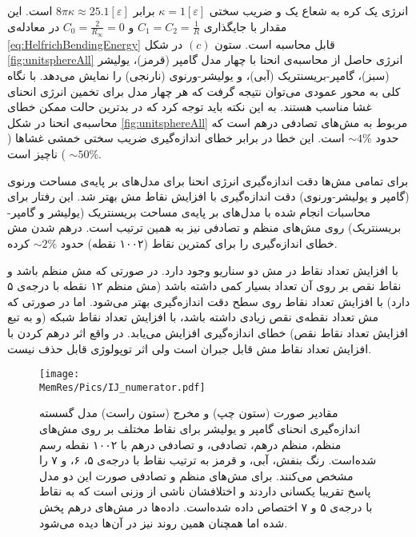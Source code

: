 
انرژی یک کره‌ به شعاع یک و ضریب سختی 
$\kappa=1[\varepsilon]$
برابر 
$8\pi\kappa\approx 25.1[\varepsilon]$
است. این مقدار با جایگذاری 
$C_1=C_2=\frac{1}{R}$
و
$C_0=\frac{2}{R_\infty}=0$
در معادله‌ی 
\ref{eq:HelfrichBendingEnergy}
قابل محاسبه‌ است. ستون 
$(c)$
 در شکل 
\ref{fig:unitsphereAll}
انرژی حاصل از محاسبه‌ی انحنا با چهار مدل گامپر (قرمز)، یولیشر (سبز)، گامپر-بریسنتریک (آبی)، و یولیشر-ورنوی (نارنجی) را نمایش می‌دهد. با نگاه کلی به محور عمودی می‌توان نتیجه گرفت که هر چهار مدل برای تخمین انرژی انحنای غشا مناسب هستند. به این نکته باید توجه کرد که در بدترین حالت ممکن خطای محاسبه‌ی انحنا در شکل 
\ref{fig:unitsphereAll}
مربوط به مش‌های تصادفی درهم است که حدود
$\sim4\%$
است. این خطا در برابر خطای اندازه‌گیری ضریب سختی خمشی غشا‌ها (
$\sim50\%$
) ناچیز است.

برای تمامی مش‌ها دقت اندازه‌گیری انرژی انحنا برای مدل‌های بر پایه‌ی مساحت ورنوی (گامپر و یولیشر-ورنوی) دقت اندازه‌گیری با افزایش نقاط مش بهتر شد. این رفتار برای محاسبات انجام شده با مدل‌های بر پایه‌ی مساحت بریسنتریک (یولیشر و گامپر-بریسنتریک) روی مش‌های منظم و تصادفی نیز به همین ترتیب است. درهم شدن مش خطای اندازه‌‌گیری را برای کمترین نقاط (۱۰۰۲ نقطه) حدود 
$\sim2\%$
کرده. 

با افزایش تعداد نقاط در مش دو سناریو وجود دارد. در صورتی که مش‌ منظم باشد و نقاط نقص بر روی آن تعداد بسیار کمی داشته باشد (مش منظم ۱۲ نقطه با درجه‌ی ۵ دارد) با افزایش تعداد نقاط روی سطح دقت اندازه‌گیری بهتر می‌شود. اما در صورتی که مش تعداد نقطه‌ی نقص زیادی داشته باشد، با افزایش تعداد نقاط شبکه (و به تبع افزایش تعداد نقاط نقص) خطای اندازه‌گیری افزایش می‌یابد. در واقع اثر درهم کردن با افزایش تعداد نقاط مش قابل جبران است ولی اثر توپولوژی قابل حذف نیست.



\begin{figure}[htbp]
\begin{center}
\texttt{[image: \\MemRes/Pics/IJ\_numerator.pdf]}
\caption{
مقادیر صورت (ستون چپ) و مخرج (ستون راست) مدل گسسته اندازه‌گیری انحنای گامپر و یولیشر برای نقاط مختلف بر روی مش‌های منظم، منظم درهم، تصادفی، و تصادفی درهم با ۱۰۰۲ نقطه رسم شده‌است. رنگ بنفش، آبی، و قرمز به ترتیب  نقاط با درجه‌ی ۵، ۶، و ۷ را مشخص می‌کنند. برای مش‌های منظم و تصادفی صورت این دو مدل پاسخ تقریبا یکسانی داردند و اختلافشان ناشی از وزنی است که به نقاط با درجه‌ی ۵ و ۷ اختصاص داده شده‌است. داده‌ها در مش‌های درهم پخش شده اما همچنان همین روند نیز در آن‌ها دیده می‌شود.
}
\label{fig:unitsphereBendingScatter}
\end{center}
\end{figure}

